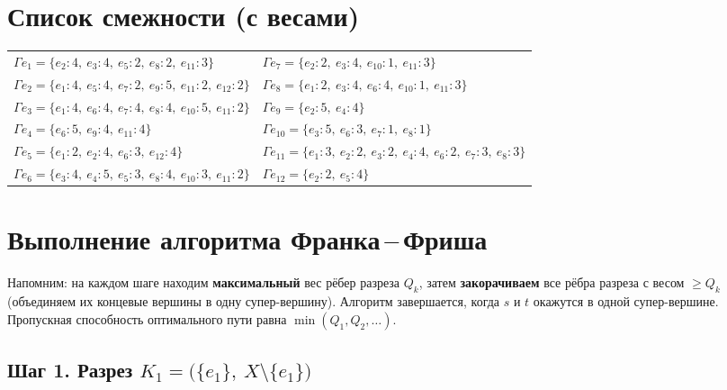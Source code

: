 \documentclass[a4paper,12pt]{article}
\begin{document}
\section*{Список смежности (с весами)}

\begin{center}
	\begin{tabular}{ll}
		$\Gamma e_1 = \{e_2{:}4,\ e_3{:}4,\ e_5{:}2,\ e_8{:}2,\ e_{11}{:}3\}$              &
		$\Gamma e_7 = \{e_2{:}2,\ e_3{:}4,\ e_{10}{:}1,\ e_{11}{:}3\}$                            \\
		$\Gamma e_2 = \{e_1{:}4,\ e_5{:}4,\ e_7{:}2,\ e_9{:}5,\ e_{11}{:}2,\ e_{12}{:}2\}$ &
		$\Gamma e_8 = \{e_1{:}2,\ e_3{:}4,\ e_6{:}4,\ e_{10}{:}1,\ e_{11}{:}3\}$                  \\
		$\Gamma e_3 = \{e_1{:}4,\ e_6{:}4,\ e_7{:}4,\ e_8{:}4,\ e_{10}{:}5,\ e_{11}{:}2\}$ &
		$\Gamma e_9 = \{e_2{:}5,\ e_4{:}4\}$                                                      \\
		$\Gamma e_4 = \{e_6{:}5,\ e_9{:}4,\ e_{11}{:}4\}$                                  &
		$\Gamma e_{10} = \{e_3{:}5,\ e_6{:}3,\ e_7{:}1,\ e_8{:}1\}$                               \\
		$\Gamma e_5 = \{e_1{:}2,\ e_2{:}4,\ e_6{:}3,\ e_{12}{:}4\}$                        &
		$\Gamma e_{11} = \{e_1{:}3,\ e_2{:}2,\ e_3{:}2,\ e_4{:}4,\ e_6{:}2,\ e_7{:}3,\ e_8{:}3\}$ \\
		$\Gamma e_6 = \{e_3{:}4,\ e_4{:}5,\ e_5{:}3,\ e_8{:}4,\ e_{10}{:}3,\ e_{11}{:}2\}$ &
		$\Gamma e_{12} = \{e_2{:}2,\ e_5{:}4\}$                                                   \\
	\end{tabular}
\end{center}

\section*{Выполнение алгоритма Франка\,--\,Фриша}

Напомним: на каждом шаге находим \textbf{максимальный} вес рёбер разреза $Q_k$,
затем \textbf{закорачиваем} все рёбра разреза с весом $\geq Q_k$
(объединяем их концевые вершины в одну супер-вершину).
Алгоритм завершается, когда $s$ и $t$ окажутся в одной супер-вершине.
Пропускная способность оптимального пути равна $\min(Q_1, Q_2, \ldots)$.

\subsection*{Шаг 1. Разрез $K_1 = \bigl(\{e_1\},\ X \setminus \{e_1\}\bigr)$}
\end{document}
